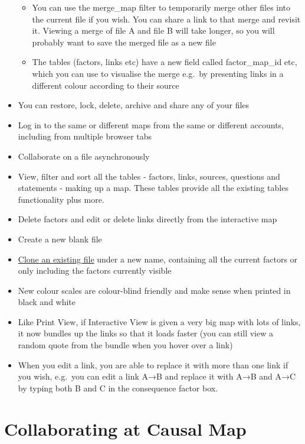\documentclass[
]{book}
\providecommand{\tightlist}{%
  \setlength{\itemsep}{0pt}\setlength{\parskip}{0pt}}
\begin{document}
\begin{itemize}
  \begin{itemize}
  \tightlist
  \item
    You can use the merge\_map filter to temporarily merge other files into the current file if you wish. You can share a link to that merge and revisit it. Viewing a merge of file A and file B will take longer, so you will probably want to save the merged file as a new file
  \item
    The tables (factors, links etc) have a new field called factor\_map\_id etc, which you can use to visualise the merge e.g.~by presenting links in a different colour according to their source
  \end{itemize}
\item
  You can restore, lock, delete, archive and share any of your files
\item
  Log in to the same or different maps from the same or different accounts, including from multiple browser tabs
\item
  Collaborate on a file asynchronously
\item
  View, filter and sort all the tables - factors, links, sources, questions and statements - making up a map. These tables provide all the existing tables functionality plus more.
\item
  Delete factors and edit or delete links directly from the interactive map
\item
  Create a new blank file
\item
  \protect\hyperlink{xown-copy}{Clone an existing file} under a new name, containing all the current factors or only including the factors currently visible
\item
  New colour scales are colour-blind friendly and make sense when printed in black and white
\item
  Like Print View, if Interactive View is given a very big map with lots of links, it now bundles up the links so that it loads faster (you can still view a random quote from the bundle when you hover over a link)
\item
  When you edit a link, you are able to replace it with more than one link if you wish, e.g.~you can edit a link A→B and replace it with A→B and A→C by typing both B and C in the consequence factor box.
\end{itemize}

\hypertarget{collaboratio}{%
\chapter{Collaborating at Causal Map}\label{collaboratio}}
\end{document}
